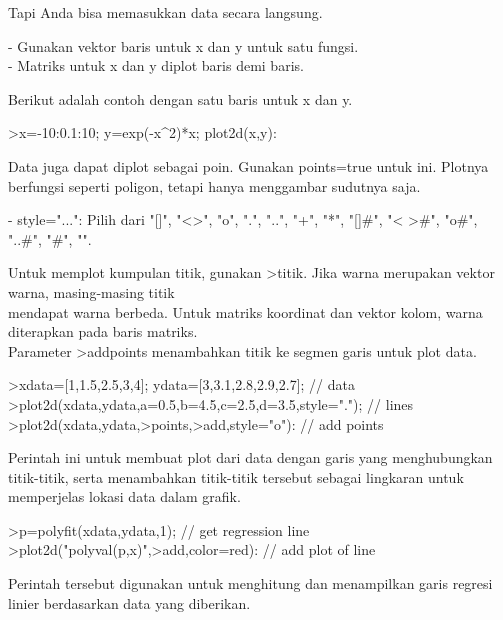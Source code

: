 \documentclass{article}
\begin{document}
\begin{eulernotebook}
\begin{eulercomment}
\begin{eulercomment}
\begin{eulercomment}
\begin{eulercomment}
\begin{eulercomment}
\begin{eulercomment}
\begin{eulercomment}
\begin{eulercomment}
\begin{eulercomment}
\begin{eulercomment}
\begin{eulercomment}
Tapi Anda bisa memasukkan data secara langsung.

- Gunakan vektor baris untuk x dan y untuk satu fungsi.\\
- Matriks untuk x dan y diplot baris demi baris.

Berikut adalah contoh dengan satu baris untuk x dan y.
\end{eulercomment}
\begin{eulerprompt}
>x=-10:0.1:10; y=exp(-x^2)*x; plot2d(x,y):
\end{eulerprompt}
\begin{eulercomment}
Data juga dapat diplot sebagai poin. Gunakan points=true untuk ini.
Plotnya berfungsi seperti poligon, tetapi hanya menggambar sudutnya
saja.

- style="...": Pilih dari "[]", "\textless{}\textgreater{}", "o", ".", "..", "+", "*", "[]#",
"\textless{} \textgreater{}#", "o#", "..#", "#", "\textbar{}".

Untuk memplot kumpulan titik, gunakan \textgreater{}titik. Jika warna merupakan
vektor warna, masing-masing titik\\
mendapat warna berbeda. Untuk matriks koordinat dan vektor kolom,
warna diterapkan pada baris matriks.\\
Parameter \textgreater{}addpoints menambahkan titik ke segmen garis untuk plot
data.
\end{eulercomment}
\begin{eulerprompt}
>xdata=[1,1.5,2.5,3,4]; ydata=[3,3.1,2.8,2.9,2.7]; // data
>plot2d(xdata,ydata,a=0.5,b=4.5,c=2.5,d=3.5,style="."); // lines
>plot2d(xdata,ydata,>points,>add,style="o"): // add points
\end{eulerprompt}
\begin{eulercomment}
Perintah ini untuk membuat plot dari data dengan garis yang
menghubungkan titik-titik, serta menambahkan titik-titik tersebut
sebagai lingkaran untuk memperjelas lokasi data dalam grafik.
\end{eulercomment}
\begin{eulerprompt}
>p=polyfit(xdata,ydata,1); // get regression line
>plot2d("polyval(p,x)",>add,color=red): // add plot of line
\end{eulerprompt}
\begin{eulercomment}
Perintah tersebut digunakan untuk menghitung dan menampilkan garis
regresi linier berdasarkan data yang diberikan.


\end{eulercomment}
\end{eulercomment}
\end{eulercomment}
\end{eulercomment}
\end{eulercomment}
\end{eulercomment}
\end{eulercomment}
\end{eulercomment}
\end{eulercomment}
\end{eulercomment}
\end{eulercomment}
\end{eulernotebook}
\end{document}
